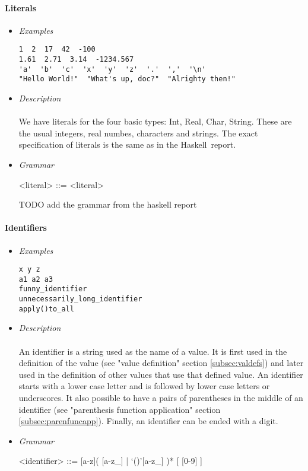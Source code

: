 \documentclass{article}
\def\H{Haskell}
\begin{document}
\paragraph{Literals}
\begin{itemize}

\item \textit{Examples}
\begin{verbatim}
1  2  17  42  -100
1.61  2.71  3.14  -1234.567
'a'  'b'  'c'  'x'  'y'  'z'  '.'  ','  '\n'
"Hello World!"  "What's up, doc?"  "Alrighty then!"
\end{verbatim}

\item \textit{Description} \\\\
We have literals for the four basic types: Int, Real, Char, String. These are the 
usual integers, real numbes, characters and strings. The exact specification of 
literals is the same as in the \H\ report.

\item \textit{Grammar}
\begin{grammar}
<literal> ::= <literal>
\end{grammar}
TODO add the grammar from the haskell report

\end{itemize}


\paragraph{Identifiers}
\begin{itemize}

\item \textit{Examples}
\begin{verbatim}
x y z
a1 a2 a3 
funny_identifier 
unnecessarily_long_identifier
apply()to_all
\end{verbatim}

\item \textit{Description} \\\\
An identifier is a string used as the name of a value. It is first used in the
definition of the value (see "value definition" section \ref{subsec:valdefs})
and later used in the definition of other values that use that defined value.
An identifier starts with a lower case letter and is followed by lower case
letters or underscores. It also possible to have a pairs of parentheses in the
middle of an identifier (see "parenthesis function application" section
\ref{subsec:parenfuncapp}). Finally, an identifier can be ended with a digit.

\item \textit{Grammar}
\begin{grammar}
<identifier> ::= [a-z]( [a-z_] | `()'[a-z_] )* [ [0-9] ]
\end{grammar}

\end{itemize}
\end{document}
